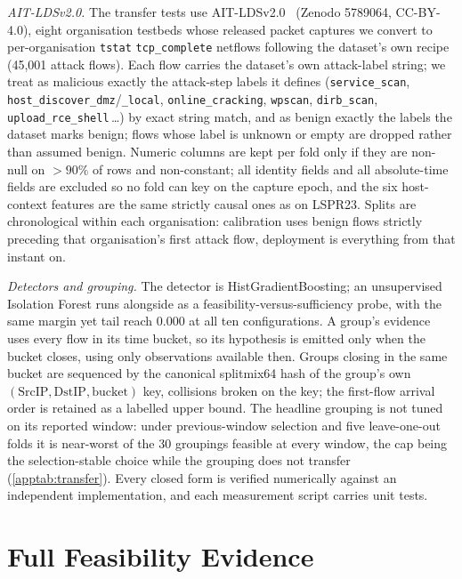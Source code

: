 \documentclass[conference]{IEEEtran}
\begin{document}
\emph{AIT-LDSv2.0.} The transfer tests use AIT-LDSv2.0~\cite{aitlds} (Zenodo 5789064, CC-BY-4.0), eight
organisation testbeds whose released packet captures we convert to per-organisation \texttt{tstat}
\texttt{tcp\_complete} netflows following the dataset's own recipe (45,001 attack flows). Each flow
carries the dataset's own attack-label string; we treat as malicious exactly the attack-step labels it
defines (\texttt{service\_scan}, \texttt{host\_discover\_dmz}/\texttt{\_local},
\texttt{online\_cracking}, \texttt{wpscan}, \texttt{dirb\_scan}, \texttt{upload\_rce\_shell}\,\ldots) by
exact string match, and as benign exactly the labels the dataset marks benign; flows whose label is
unknown or empty are dropped rather than assumed benign. Numeric columns are kept per fold only if they
are non-null on $>\!90\%$ of rows and non-constant; all identity fields and all absolute-time fields are
excluded so no fold can key on the capture epoch, and the six host-context features are the same strictly
causal ones as on LSPR23. Splits are chronological within each organisation: calibration uses benign
flows strictly preceding that organisation's first attack flow, deployment is everything from that
instant on.

\emph{Detectors and grouping.} The detector is HistGradientBoosting; an unsupervised Isolation Forest runs
alongside as a feasibility-versus-sufficiency probe, with the same margin yet tail reach $0.000$ at all
ten configurations. A group's evidence uses every flow in its time bucket, so its hypothesis is emitted
only when the bucket closes, using only observations available then. Groups closing in the same bucket
are sequenced by the canonical splitmix64 hash of the group's own $(\mathrm{SrcIP},\mathrm{DstIP},
\text{bucket})$ key, collisions broken on the key; the first-flow arrival order is retained as a labelled
upper bound. The headline grouping is not tuned on its reported window: under previous-window selection
and five leave-one-out folds it is near-worst of the 30 groupings feasible at every window, the cap
being the selection-stable choice while the grouping does not transfer (\cref{apptab:transfer}). Every
closed form is verified numerically against an independent implementation, and each measurement script
carries unit tests.

\section{Full Feasibility Evidence}\label{app:feasibility}\label{app:matrices}\label{app:boundary}
\end{document}
